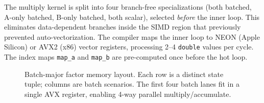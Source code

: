 \documentclass[11pt, letterpaper]{article}
\theoremstyle{definitionstyle}
\begin{document}
The multiply kernel is split into four branch-free specializations
(both batched, A-only batched, B-only batched, both scalar), selected
\emph{before} the inner loop. This eliminates data-dependent branches
inside the SIMD region that previously prevented auto-vectorization.
The compiler maps the inner loop to NEON (Apple Silicon) or AVX2 (x86)
vector registers, processing 2--4 \texttt{double} values per cycle.
The index maps \texttt{map\_a} and \texttt{map\_b} are pre-computed once
before the hot loop.

\begin{figure}[ht]
\centering
{}
\caption{Batch-major factor memory layout. Each row is a distinct state
tuple; columns are batch scenarios. The first four batch lanes fit in a
single AVX register, enabling 4-way parallel multiply/accumulate.}
\label{fig:memory-layout}
\end{figure}


\end{document}
